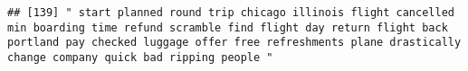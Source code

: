 \documentclass[
]{article}
\begin{document}
\begin{verbatim}
## [139] " start planned round trip chicago illinois flight cancelled min boarding time refund scramble find flight day return flight back portland pay checked luggage offer free refreshments plane drastically change company quick bad ripping people "                                                                                                                                                                                                                                                                                                                                                                                                                                                                                                                                                                                                                                                                                                                                                                                                                                                                                                                                                                                                                                                                                                                                                                                                                                                                                                                                                                                                                                                                                                                                              

\end{verbatim}
\end{document}
